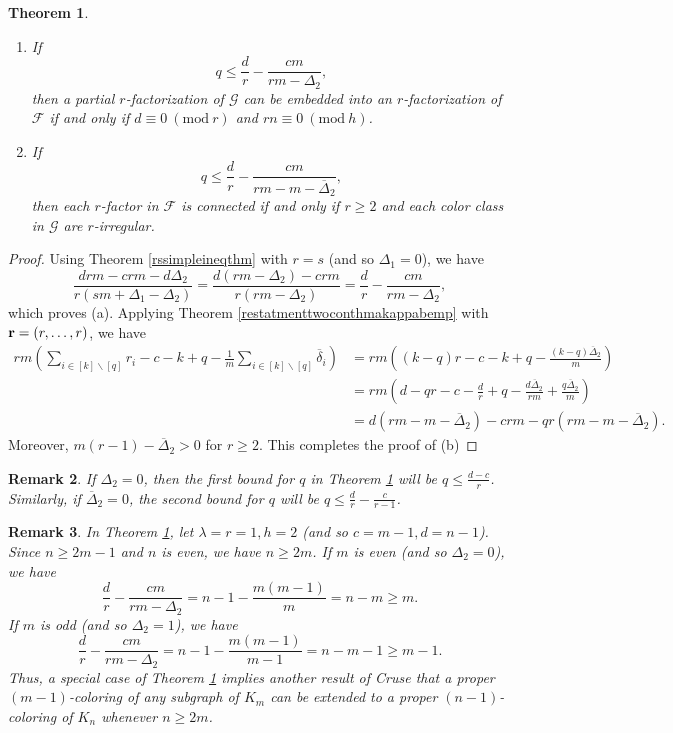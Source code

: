 \documentclass[12pt,oneside]{amsart}
\newtheorem{theorem}{Theorem}[section]
\newtheorem{remark}[theorem]{Remark}
\newcommand{\Mod}[1]{\ (\mathrm{mod}\ #1)}
\newcommand{\cc}{\mathcal}
\begin{document}
\begin{theorem} \label{last2boundthm}
\begin{enumerate}
    \item [\textup{(a)}] If $$q\leq \dfrac{d}{r}-\frac{cm}{rm-\Delta_2},$$  then  a partial $r$-factorization of $\cc G$ can be embedded into an  $r$-factorization of $\cc F$  if and only if $d\equiv 0 \Mod r$ and $rn\equiv 0 \Mod h$.
    \item [\textup{(b)}] If 
$$q\leq \frac{d}{r}-\frac{cm}{rm-m-\overline{\Delta}_2},$$ 
then  each  $r$-factor in  $\cc F$ is connected  if and only if $r\geq 2$ and each  color class in $\cc G$ are $r$-irregular.
\end{enumerate}
\end{theorem}
\begin{proof} Using Theorem \ref{rssimpleineqthm} with $r=s$ (and so $\Delta_1=0$), we have
$$\dfrac{drm-crm- d \Delta_2}{r(sm+\Delta_1-\Delta_2)}=\dfrac{d(rm-  \Delta_2)-crm}{r(rm-\Delta_2)}=\frac{d}{r}-\frac{cm}{rm-\Delta_2},$$
which proves (a). 
Applying Theorem \ref{restatmenttwoconthmakappabemp} with $\vb{r}=(r,\dots,r)$, we have
\begin{align*}
rm\left(\sum_{i\in [k] \backslash [q]} r_i-c-k+q- \frac{1}{m}\sum_{i\in [k] \backslash [q]} \overline{\delta}_i\right)&=rm\left((k-q)r-c-k+q-\frac{(k-q)\overline{\Delta}_2}{m}\right)\\
&=rm\left(d-qr-c-\frac{d}{r}+q-\frac{d\overline{\Delta}_2}{rm}+\frac{q \overline{\Delta}_2}{m}\right)\\
&=d\left(rm-m-\overline{\Delta}_2\right)-crm-qr\left(rm-m-\overline{\Delta}_2\right).
\end{align*}
Moreover, $m(r-1)-\overline{\Delta}_2>0$ for $r\geq 2$. This completes the proof of (b)
\end{proof}
\begin{remark}
If $\Delta_2=0$,  then  the first bound for $q$ in Theorem \ref{last2boundthm} will be $q\leq \frac{d-c}{r}$. Similarly, if $\overline{\Delta}_2=0$,  the second bound for $q$ will be $q\leq \frac{d}{r}-\frac{c}{r-1}$.
\end{remark}
\begin{remark} \label{remarkcruse} 
In Theorem \ref{last2boundthm}, let $\lambda=r=1, h=2$ (and so $c=m-1, d=n-1$). Since  $n\geq 2m-1$ and $n$ is even, we have  $n\geq 2m$. If $m$ is even (and so $\Delta_2=0$), we have $$\dfrac{d}{r}-\frac{cm}{rm-\Delta_2}=n-1-\frac{m(m-1)}{m}=n-m\geq m.$$
If $m$ is odd (and so $\Delta_2=1$), we have $$\dfrac{d}{r}-\frac{cm}{rm-\Delta_2}=n-1-\frac{m(m-1)}{m-1}=n-m-1\geq m-1.$$
Thus, a special case of Theorem \ref{last2boundthm} implies another result of Cruse \cite{MR0329925}  that a proper $(m-1)$-coloring of any subgraph of $K_m$ can be extended to a proper $(n-1)$-coloring of $K_n$ whenever $n\geq 2m$. 
\end{remark}
\end{document}
